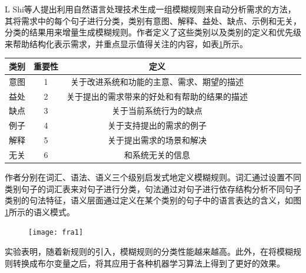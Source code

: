 L Shi等人\cite{shi2017understanding}提出利用自然语言处理技术生成一组模糊规则来自动分析需求的方法，其将需求中的每个句子进行分类，类别有意图、解释、益处、缺点、示例和无关，分类的结果用来增量生成模糊规则。作者定义了这些类别以及类别的定义和优先级来帮助结构化表示需求，并重点显示值得关注的内容，如表\ref{tab:fra0}所示。
\begin{table}[htb]
    \label{tab:fra0}
    \centering
    \footnotesize%
    \setlength{\tabcolsep}{4pt}%
    \renewcommand{\arraystretch}{1.2}%
\begin{tabular}{lcccccccc}
\hline
类别 & 重要性 & 定义                     \\
\hline
意图 & 1   & 关于改进系统和功能的主意、需求、期望的描述  \\
益处 & 2   & 关于提出的需求带来的好处和有帮助的结果的描述 \\
缺点 & 3   & 关于当前系统行为的缺点            \\
例子 & 4   & 关于支持提出的需求的例子           \\
解释 & 5   & 关于提出需求的场景和解决           \\
无关 & 6   & 和系统无关的信息              \\
\hline
\end{tabular}
\end{table}
作者分别在词汇、语法、语义三个级别启发式地定义模糊规则。词汇通过设置不同类别句子的词汇表来对句子进行分类，句法通过对句子进行依存结构分析不同句子类别的句法特征，语义层面通过定义在某个类别的句子中的语言表达的含义，如图\ref{fig:fra1}所示的语义模式。
\begin{figure}[htb]
    \centering
    \texttt{[image: fra1]}
    \label{fig:fra1}
\end{figure}
实验表明，随着新规则的引入，模糊规则的分类性能越来越高。此外，在将模糊规则转换成布尔变量之后，将其应用于各种机器学习算法上得到了更好的效果。

